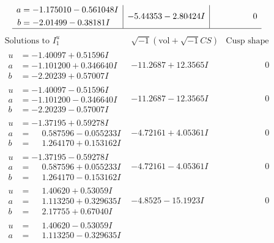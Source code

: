 \documentclass[1p]{elsarticle_modified}
\theoremstyle{definition}
\newcommand{\I}{\sqrt{-1}}
\begin{document}
$$\begin{array}{c|c|c}
\begin{aligned}
a &= -1.175010 - 0.561048 I \\
b &= -2.01499 - 0.38181 I\end{aligned}
 & -5.44353 - 2.80424 I & \phantom{-0.000000 } 0\\
 \hline 
 \end{array}$$\newpage$$\begin{array}{c|c|c}  
\text{Solutions to }I^u_{1}& \I (\text{vol} + \sqrt{-1}CS) & \text{Cusp shape}\\
 \hline 
\begin{aligned}
u &= -1.40097 + 0.51596 I \\
a &= -1.101200 + 0.346640 I \\
b &= -2.20239 + 0.57007 I\end{aligned}
 & -11.2687 + 12.3565 I & \phantom{-0.000000 } 0 \\ \hline\begin{aligned}
u &= -1.40097 - 0.51596 I \\
a &= -1.101200 - 0.346640 I \\
b &= -2.20239 - 0.57007 I\end{aligned}
 & -11.2687 - 12.3565 I & \phantom{-0.000000 } 0 \\ \hline\begin{aligned}
u &= -1.37195 + 0.59278 I \\
a &= \phantom{-}0.587596 - 0.055233 I \\
b &= \phantom{-}1.264170 + 0.153162 I\end{aligned}
 & -4.72161 + 4.05361 I & \phantom{-0.000000 } 0 \\ \hline\begin{aligned}
u &= -1.37195 - 0.59278 I \\
a &= \phantom{-}0.587596 + 0.055233 I \\
b &= \phantom{-}1.264170 - 0.153162 I\end{aligned}
 & -4.72161 - 4.05361 I & \phantom{-0.000000 } 0 \\ \hline\begin{aligned}
u &= \phantom{-}1.40620 + 0.53059 I \\
a &= \phantom{-}1.113250 + 0.329635 I \\
b &= \phantom{-}2.17755 + 0.67040 I\end{aligned}
 & -4.8525 - 15.1923 I & \phantom{-0.000000 } 0 \\ \hline\begin{aligned}
u &= \phantom{-}1.40620 - 0.53059 I \\
a &= \phantom{-}1.113250 - 0.329635 I \\

\end{aligned}
\end{array}$$
\end{document}
